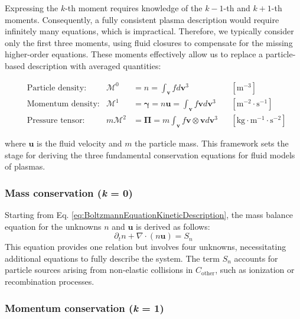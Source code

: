 Expressing the $k$-th moment requires knowledge of the $k-1$-th and $k+1$-th moments. Consequently, a fully consistent plasma description would require infinitely many equations, which is impractical. Therefore, we typically consider only the first three moments, using fluid closures to compensate for the missing higher-order equations. These moments effectively allow us to replace a particle-based description with averaged quantities:

\begin{align}
	&\text{Particle density:} & \mathcal{M}^0 &= n = \int_\mathbf{v} f d\mathbf{v}^3 && \left[\text{m}^{-3}\right] \\
	&\text{Momentum density:} & \mathcal{M}^1 &= \boldsymbol{\gamma}  = n \mathbf{u} = \int_\mathbf{v} f \mathbf{v} d\mathbf{v}^3 && \left[\text{m}^{-2} \cdot \text{s}^{-1}\right] \\
	&\text{Pressure tensor:}   &  m \mathcal{M}^2 &= \boldsymbol{\Pi} = m \int_\mathbf{v} f \mathbf{v} \otimes \mathbf{v} d\mathbf{v}^3 && \left[\text{kg} \cdot \text{m}^{-1} \cdot \text{s}^{-2}\right]
\end{align}

where $\mathbf{u}$ is the fluid velocity and $m$ the particle mass. This framework sets the stage for deriving the three fundamental conservation equations for fluid models of plasmas.



\subsubsection{Mass conservation (\textit{k} = 0)}

Starting from Eq. \ref{eq:BoltzmannEquationKineticDescription}, the mass balance equation for the unknowns $n$ and $\mathbf{u}$ is derived as follows:
\begin{equation}
	\label{eq:ZeroMomentTransportEquation}
	\partial_t n + \nabla \cdot (n\mathbf{u}) = S_n
\end{equation}
This equation provides one relation but involves four unknowns, necessitating additional equations to fully describe the system. The term $S_n$ accounts for particle sources arising from non-elastic collisions in $C_{\text{other}}$, such as ionization or recombination processes.

\subsubsection{Momentum conservation (\textit{k} = 1)}


